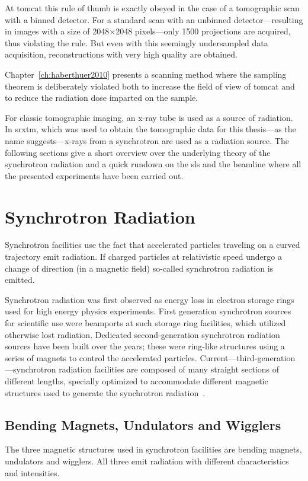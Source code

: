 At \ac{tomcat} this rule of thumb is exactly obeyed in the case of a tomographic scan with a binned detector. For a standard scan with an unbinned detector---resulting in images with a size of 2048$\times$2048 pixels---only 1500 projections are acquired, thus violating the rule. But even with this seemingly undersampled data acquisition, reconstructions with very high quality are obtained.

Chapter~\ref{ch:haberthuer2010} presents a scanning method where the sampling theorem is deliberately violated both to increase the field of view of \ac{tomcat} and to reduce the radiation dose imparted on the sample.

For classic tomographic imaging, an x-ray tube is used as a source of radiation. In \ac{srxtm}, which was used to obtain the tomographic data for this thesis---as the name suggests---x-rays from a synchrotron are used as a radiation source. The following sections give a short overview over the underlying theory of the synchrotron radiation and a quick rundown on the \ac{sls} and the beamline where all the presented experiments have been carried out.

\section{Synchrotron Radiation}
Synchrotron facilities use the fact that accelerated particles traveling on a curved trajectory emit radiation. If charged particles at relativistic speed undergo a change of direction (\ie in a magnetic field) so-called synchrotron radiation is emitted. 

Synchrotron radiation was first observed as energy loss in electron storage rings used for high energy physics experiments. First generation synchrotron sources for scientific use were beamports at such storage ring facilities, which utilized otherwise lost radiation. Dedicated second-generation synchrotron radiation sources have been built over the years; these were ring-like structures using a series of magnets to control the accelerated particles. Current---third-generation---synchrotron radiation facilities are composed of many straight sections of different lengths, specially optimized to accommodate different magnetic structures used to generate the synchrotron radiation~\cite{Stampanoni2002a,Margaritondo2002,wwwsls}. 

\subsection{Bending Magnets, Undulators and Wigglers}
The three magnetic structures used in synchrotron facilities are bending magnets, undulators and wigglers. All three emit radiation with different characteristics and intensities.

